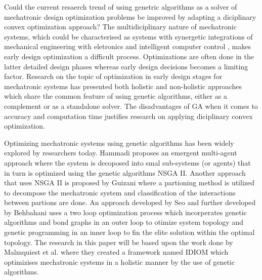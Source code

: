 



Could the current resaerch trend of using genetric algorithms as a solver of mechatronic design optimization problems be improved by adapting a diciplinary convex optimization approach? The multidiciplinary nature of mechatronic systems, which could be characterised as systems with synergetic integrations of mechanical engineering with eletronics and intelligent computer control \cite{harashima1999}, makes early design optimization a difficult process. Optimizations are often done in the latter detailed design phases \cite{(I CEDEX) Engineering design; A systematic approach, 3rd ed} whereas early design decisions becomes a limiting factor. Research on the topic of optimization in early design stages for mechatronic systems has presented both holistic and non-holistic approaches which share the common feature of using genetic algorithms, either as a complement or as a standalone solver. The disadvantages of GA when it comes to accuracy and computation time justifies research on applying diciplinary convex optimization.

\par
Optimizing mechatronic systems using genetic algorithms has been widely explored by researchers today. Hammadi \cite{Hammadi} proposes an emergent multi-agent approach where the system is decoposed into smal sub-systems (or agents) that in turn is optimized using the genetic algorithms NSGA II. Another approach that uses NSGA II is proposed by Guizani \cite{GUizani} where a partioning method is utilized to decompose the mechatronic system and classification of the interactions between partions are done. An approach developed by Seo \cite{Seo} and further developed by Behbahani \cite{Behabani} uses a two loop optimization process which incorperates genetic algorithms and bond graphs in an outer loop to otimize system topology and genetic programming in an inner loop to fin the elite solution within the optimal topology. The research in this paper will be based upon the work done by Malmquiest et al. \cite{Malmquist} where they created a framework named IDIOM which optimizises mechatronic systems in a holistic manner by the use of genetic algorithms.

